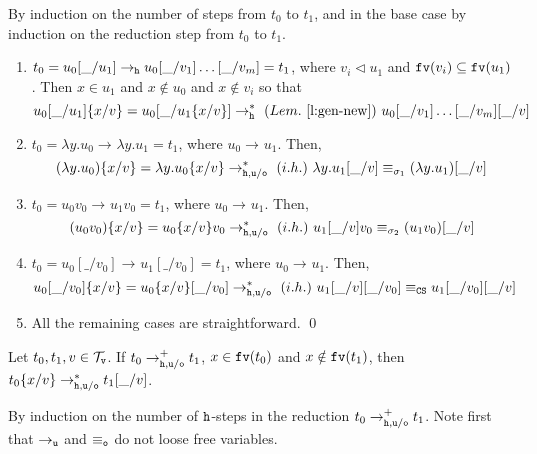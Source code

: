 \documentclass{LMCS}
\renewcommand{\>}{\rightarrow}
\def\lam{\lambda}
\def\sig{\sigma}
\newcommand{\Rew}[1]{\rightarrow_{#1}}
\newcommand{\Rewn}[2][*]{\rightarrow^{#1}_{#2}}
\newcommand{\Rewnmod}[2]{\rightarrow^*_{#1/#2}}
\newcommand{\Rewplusmod}[2]{\rightarrow^+_{#1/#2}}
\newcommand{\isubs}[1]{ \{ #1  \} }
\newcommand{\fv}[1]{{\tt fv}(#1)}
\newcommand{\CS}{{\tt CS}}
\newcommand{\ih}{i.h.}
\newcommand{\termsv}{\mathcal{T}_{\tt v}}
\newcommand{\unboxed}{{\tt u}}
\newcommand{\eqo}{\equiv_\osym}
\newcommand{\osym}{{\tt o}}
\newcommand{\New}{{\tt h}}
\newcommand{\void}{\_}
\newcommand{\subt}{\triangleleft}
\begin{document}
\proof
By induction on the number of steps from $t_0$ to $t_1$, and in the
base case by induction on the reduction step from $t_0$ to $t_1$. 
\begin{enumerate}[$\bullet$]
\item $t_0 = u_0[\void/u_1] \Rew{\New} u_0[\void/v_1] \ldots [\void/v_m] = t_1$,  
      where 
     $v_i \subt u_1$ and $\fv{v_i} \subseteq \fv{ u_1}$. 
     Then $x \in  u_1$ and $x \notin u_0$ and  $x \notin  v_i$ so that 
     \[ 
           u_0[\void/u_1]\isubs{x/v}  = \\
           u_0[\void/u_1\isubs{x/v}]  \Rewn{\New} \ (Lem.~\ref{l:gen-new})\ 
           u_0[\void/v_1] \ldots [\void/v_m] [\void/v] \]
\item $t_0  = \lam y. u_0 \Rew{}  \lam y. u_1 =t_1$, where $u_0 \Rew{} u_1$.
        Then,
        \[ (\lam y. u_0)\isubs{x/v}     = 
           \lam y. u_0\isubs{x/v}    \Rewnmod{\New,\unboxed}{\osym}\ (\ih)\  
           \lam y. u_1[\void/v]        \equiv_{\sig_1} (\lam y. u_1)[\void/v] \]   
  \item $t_0  = u_0 v_0  \Rew{}  u_1 v_0 =t_1$, where $u_0 \Rew{} u_1$.
        Then,
        \[ (u_0 v_0) \isubs{x/v}  =  
            u_0 \isubs{x/v} v_0    \Rewnmod{\New,\unboxed}{\osym}\ (\ih)\ 
         u_1 [\void/v] v_0   \equiv_{\sig_2} (u_1 v_0)[\void/v] \] 
  \item $t_0  = u_0[\void/v_0] \Rew{} u_1[\void/v_0] =t_1$, where $u_0 \Rew{} u_1$.
 Then, 
        \[ u_0[\void/v_0]\isubs{x/v}  = 
        u_0 \isubs{x/v}[\void/v_0]  \Rewnmod{\New, \unboxed}{\osym}\ (\ih)\
        u_1[\void/v][\void/v_0]  \equiv_{\CS} 
        u_1[\void/v_0][\void/v] \]  
\item All the remaining cases are straightforward.       
\qed 
\end{enumerate}



\begin{cor}
\label{c:stability-substitution}
Let $t_0, t_1, v \in \termsv$. 
If $t_0 \Rewplusmod{\New,\unboxed}{\osym} t_1$, $x \in \fv{t_0}$ and $x \notin  \fv{t_1}$,
then $t_0\isubs{x/v} \Rewnmod{\New,\unboxed}{\osym}
  t_1[\void/v]$. 
\end{cor}

\proof
By induction on the number of $\New$-steps in the reduction 
$t_0 \Rewplusmod{\New,\unboxed}{\osym} t_1$.
Note first that $\Rew{\unboxed}$ and $\eqo$ do not loose free variables.
\end{document}
